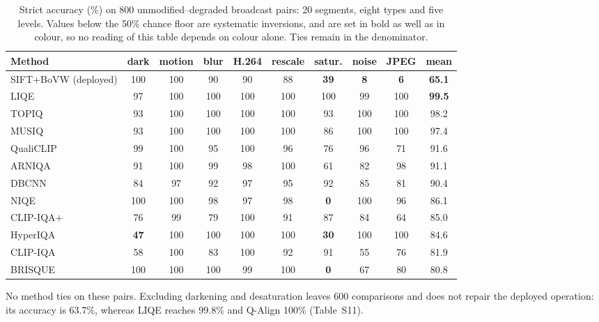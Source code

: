 \begin{table}[!ht]
\centering
\caption{Strict accuracy (\%) on 800 unmodified--degraded broadcast pairs: 20
segments, eight types and five levels. Values below the 50\% chance floor are systematic inversions, and are set in bold as well as in colour, so no reading of this table depends on colour alone. Ties remain in the denominator.}
\label{tab:constructed}
\scriptsize
\setlength{\tabcolsep}{1.9pt}
\begin{tabular}{@{}lccccccccc@{}}
\toprule
\textbf{Method} & \textbf{dark} & \textbf{motion} & \textbf{blur} & \textbf{H.264}
& \textbf{rescale} & \textbf{satur.} & \textbf{noise} & \textbf{JPEG} & \textbf{mean} \\
\midrule
\rowcolor{catbovw!12}SIFT+BoVW (deployed) & 100 & 100 & 90 & 90 & 88 &
\textcolor{accentred}{\textbf{39}} & \textcolor{accentred}{\textbf{8}} &
\textcolor{accentred}{\textbf{6}} & \textbf{65.1} \\
\midrule
LIQE & 97 & 100 & 100 & 100 & 100 & 100 & 99 & 100 & \textbf{99.5} \\
TOPIQ & 93 & 100 & 100 & 100 & 100 & 93 & 100 & 100 & 98.2 \\
MUSIQ & 93 & 100 & 100 & 100 & 100 & 86 & 100 & 100 & 97.4 \\
QualiCLIP & 99 & 100 & 95 & 100 & 96 & 76 & 96 & 71 & 91.6 \\
ARNIQA & 91 & 100 & 99 & 98 & 100 & 61 & 82 & 98 & 91.1 \\
DBCNN & 84 & 97 & 92 & 97 & 95 & 92 & 85 & 81 & 90.4 \\
NIQE & 100 & 100 & 98 & 97 & 98 & \textcolor{accentred}{\textbf{0}} & 100 & 96 & 86.1 \\
CLIP-IQA$+$ & 76 & 99 & 79 & 100 & 91 & 87 & 84 & 64 & 85.0 \\
HyperIQA & \textcolor{accentred}{\textbf{47}} & 100 & 100 & 100 & 100 & \textcolor{accentred}{\textbf{30}} & 100 & 100 & 84.6 \\
CLIP-IQA & 58 & 100 & 83 & 100 & 92 & 91 & 55 & 76 & 81.9 \\
BRISQUE & 100 & 100 & 100 & 99 & 100 & \textcolor{accentred}{\textbf{0}} & 67 & 80 & 80.8 \\
\bottomrule
\end{tabular}
\end{table}

No method ties on these pairs. Excluding darkening and desaturation leaves 600
comparisons and does not repair the deployed operation: its accuracy is 63.7\%,
whereas LIQE reaches 99.8\% and Q-Align 100\% (Table~S11). 

